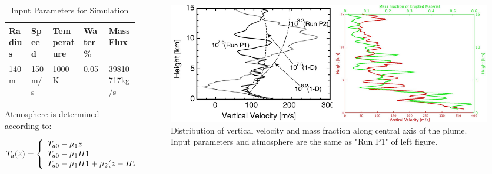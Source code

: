 \documentclass[final]{beamer}
\newlength{\onecolwid}
\newlength{\twocolwid}
\begin{document}
\begin{frame}[t]
\begin{columns}[t]
\begin{column}{\twocolwid}
\begin{columns}[t,totalwidth=\twocolwid]
\begin{column}{\onecolwid}

\begin{table}
\centering
\caption{Input Parameters for Simulation}
\begin{tabular}{|l|l|l|l|l|}
\toprule
\midrule
Radius& Speed& Temperature& Water\%& Mass Flux \\
\hline
140m& 150m/s& 1000K& 0.05& 39810717kg/s\\
\bottomrule
\end{tabular}
\end{table}
Atmosphere is determined according to:

\begin{displaymath}
   T_a(z) = \left\{
     \begin{array}{l l}
       T_{a0} - \mu_1 z & \ \ 0\leq z \textless H_1\\
       T_{a0} - \mu_1 H1 & \ \  H_1\leq z \textless H_2 \\
       T_{a0} - \mu_1 H1 + \mu_2 (z-H2) & \ \  z \textgreater H_2
     \end{array}
   \right.
\end{displaymath} 


\end{column} \vspace{-1.8in}%


\begin{column}{\onecolwid} %


\begin{figure}
\includegraphics[height= 0.40\linewidth]{Velocity_at_cent}
\caption{Distribution of vertical velocity and mass fraction along central axis of the plume. Input parameters and atmosphere are the same as "Run P1" of left figure\cite{suzuki2005numerical}.}
\end{figure}


\end{column}
\end{columns}
\end{column}
\end{columns}
\end{frame}
\end{document}
